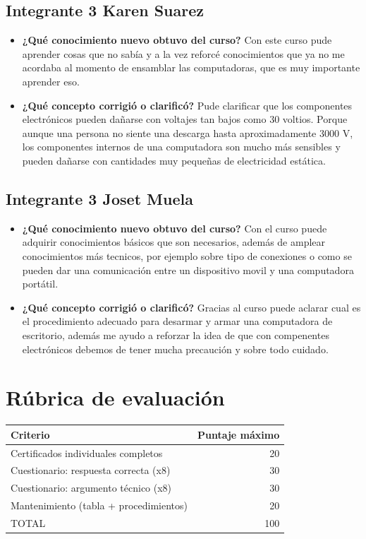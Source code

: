 \documentclass{article}
\begin{document}
\subsection{Integrante 3 Karen Suarez}
\label{sec:orgf8b5f26}
\begin{itemize}
\item \textbf{¿Qué conocimiento nuevo obtuvo del curso?} Con este curso pude
aprender cosas que no sabía y a la vez reforcé conocimientos que
ya no me acordaba al momento de ensamblar las computadoras, que
es muy importante aprender eso.
\item \textbf{¿Qué concepto corrigió o clarificó?} Pude clarificar que los
componentes electrónicos pueden dañarse con voltajes tan bajos
como 30 voltios. Porque aunque una persona no siente una descarga
hasta aproximadamente 3000 V, los componentes internos de una
computadora son mucho más sensibles y pueden dañarse con
cantidades muy pequeñas de electricidad estática.
\end{itemize}

\subsection{Integrante 3 Joset Muela}
\label{sec:org5bfb0f7}
\begin{itemize}
\item \textbf{¿Qué conocimiento nuevo obtuvo del curso?} Con el curso puede
adquirir conocimientos básicos que son necesarios, además de amplear
conocimientos más tecnicos, por ejemplo sobre tipo de conexiones
o como se pueden dar una comunicación entre un dispositivo movil
y una computadora portátil.
\item \textbf{¿Qué concepto corrigió o clarificó?} Gracias al curso puede
aclarar cual es el procedimiento adecuado para desarmar y armar
una computadora de escritorio, además me ayudo a reforzar la idea
de que con compenentes electrónicos debemos de tener mucha
precaución y sobre todo cuidado.
\end{itemize}

\section{Rúbrica de evaluación}
\label{sec:orgd726d7c}

\begin{center}
\begin{tabular}{lr}
Criterio & Puntaje máximo\\[0pt]
\hline
Certificados individuales completos & 20\\[0pt]
Cuestionario: respuesta correcta (x8) & 30\\[0pt]
Cuestionario: argumento técnico (x8) & 30\\[0pt]
Mantenimiento (tabla + procedimientos) & 20\\[0pt]
TOTAL & 100\\[0pt]
\end{tabular}
\end{center}
\end{document}
